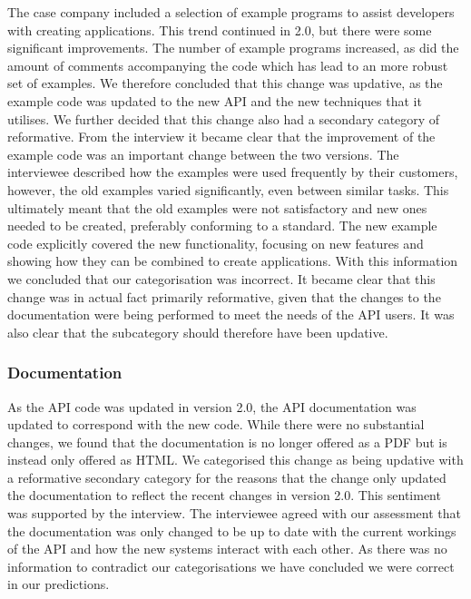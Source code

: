 \documentclass{sig-alternate}
\begin{document}
The case company included a selection of example programs to assist developers with creating applications. This trend continued in 2.0, but there were some significant improvements. The number of example programs increased, as did the amount of comments accompanying the code which has lead to an more robust set of examples.
We therefore concluded that this change was updative, as the example code was updated to the new API and the new techniques that it utilises. We further decided that this change also had a secondary category of reformative.
From the interview it became clear that the improvement of the example code was an important change between the two versions. The interviewee described how the examples were used frequently by their customers, however, the old examples varied significantly, even between similar tasks. This ultimately meant that the old examples were not satisfactory and new ones needed to be created, preferably conforming to a standard. The new example code explicitly covered the new functionality, focusing on new features and showing how they can be combined to create applications.
With this information we concluded that our categorisation was incorrect. It became clear that this change was in actual fact primarily reformative, given that the changes to the documentation were being performed to meet the needs of the API users. It was also clear that the subcategory should therefore have been updative. 

\subsubsection{Documentation}

As the API code was updated in version 2.0, the API documentation was updated to correspond with the new code. While there were no substantial changes, we found that the documentation is no longer offered as a PDF but is instead only offered as HTML. 
We categorised this change as being updative with a reformative secondary category for the reasons that the change only updated the documentation to reflect the recent changes in version 2.0.
This sentiment was supported by the interview. The interviewee agreed with our assessment that the documentation was only changed to be up to date with the current workings of the API and how the new systems interact with each other.
As there was no information to contradict our categorisations we have concluded we were correct in our predictions.
\end{document}
